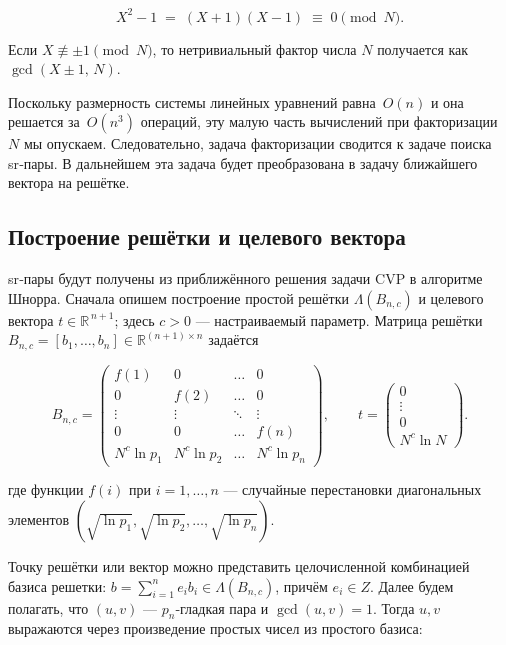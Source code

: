 \begin{equation}
  X^{2}-1 \;=\; (X+1)(X-1) \;\equiv\; 0 \pmod{N}.
\end{equation}

\noindent Если $X \not\equiv \pm1 \pmod{N}$, то нетривиальный фактор числа $N$
получается как $\gcd(X \pm 1,\, N)$.

Поскольку размерность системы линейных уравнений равна~$O(n)$ и она решается
за~$O(n^{3})$ операций, эту малую часть вычислений при факторизации~$N$ мы
опускаем. Следовательно, задача факторизации сводится к задаче поиска sr‑пары.
В дальнейшем эта задача будет преобразована в задачу ближайшего вектора на
решётке.

\subsection*{Построение решётки и целевого вектора}

sr‑пары будут получены из приближённого решения задачи CVP в алгоритме Шнорра.
Сначала опишем построение простой решётки $\Lambda(B_{n,c})$ и целевого вектора
$t\in \mathbb{R}^{\,n+1}$; здесь $c>0$ — настраиваемый параметр. Матрица решётки
$B_{n,c}=[b_{1},\dots,b_{n}]\in \mathbb{R}^{(n+1)\times n}$ задаётся

\begin{equation}
  B_{n,c} =
  \begin{pmatrix}
    f(1)      & 0        & \dots & 0        \\
    0         & f(2)     & \dots & 0        \\
    \vdots    & \vdots   & \ddots& \vdots   \\
    0         & 0        & \dots & f(n)     \\
    N^{c}\ln p_{1} & N^{c}\ln p_{2} & \dots & N^{c}\ln p_{n}
  \end{pmatrix},
  \qquad
  t =
  \begin{pmatrix}
    0 \\[2pt]
    \vdots \\[2pt]
    0 \\[2pt]
    N^{c}\ln N
  \end{pmatrix}.
\end{equation}

\noindent где функции $f(i)$ при $i=1,\dots,n$ — случайные перестановки
диагональных элементов $(\sqrt{\ln p_{1}},\sqrt{\ln p_{2}},\dots, \sqrt{\ln
p_{n}})$.

Точку решётки или вектор можно представить целочисленной комбинацией базиса
решетки: $b=\sum_{i=1}^{n} e_{i} b_{i}\in\Lambda(B_{n,c})$, причём $e_{i}\in
Z$. Далее будем полагать, что $(u,v)$ — $p_{n}$‑гладкая пара и $\gcd(u,v)=1$.
Тогда $u,v$ выражаются через произведение простых чисел из простого базиса:

